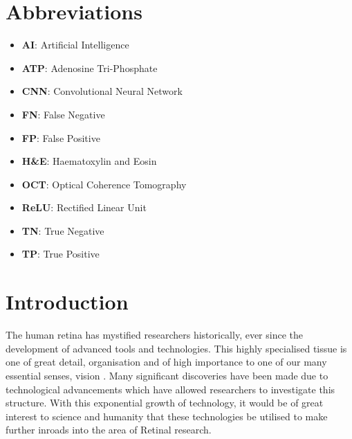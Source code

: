 \documentclass[a4paper]{article}
\begin{document}
\section{Abbreviations}
\begin{itemize}
    \vspace{3mm}
    \item \textbf{AI}: Artificial Intelligence
    \vspace{3mm}
    \item \textbf{ATP}: Adenosine Tri-Phosphate
    \vspace{3mm}
    \item \textbf{CNN}: Convolutional Neural Network
    \vspace{3mm}
    \item \textbf{FN}: False Negative
    \vspace{3mm}
    \item \textbf{FP}: False Positive
    \vspace{3mm}
    \item \textbf{H\&E}: Haematoxylin and Eosin
    \vspace{3mm}
    \item \textbf{OCT}: Optical Coherence Tomography
    \vspace{3mm}
    \item \textbf{ReLU}: Rectified Linear Unit
    \vspace{3mm}
    \item \textbf{TN}: True Negative
    \vspace{3mm}
    \item \textbf{TP}: True Positive
\end{itemize}

\newpage

\section{Introduction}
The human retina has mystified researchers historically, ever since the development of advanced tools and technologies. This highly specialised tissue is one of great detail, organisation and of high importance to one of our many essential senses, vision \cite{RN1}. Many significant discoveries have been made due to technological advancements which have allowed researchers to investigate this structure. With this exponential growth of technology, it would be of great interest to science and humanity that these technologies be utilised to make further inroads into the area of Retinal research. \vspace{3mm}
\end{document}
